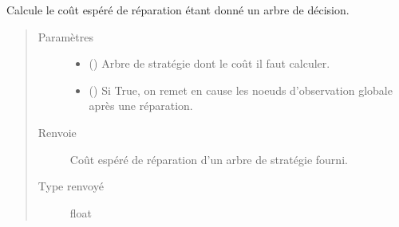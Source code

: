 \documentclass[letterpaper,10pt,french]{sphinxmanual}
\begin{document}
\begin{fulllineitems}
\begin{fulllineitems}
\label{\detokenize{index:DecisionTheoreticTroubleshooting.TroubleShootingProblem.expected_cost_of_repair}}
Calcule le coût espéré de réparation étant donné un arbre de décision.
\begin{quote}\begin{description}
\item[{Paramètres}] \leavevmode\begin{itemize}
\item {} 
 ({\hyperref[\detokenize{index:StrategyTree.StrategyTree}]{}}) \textendash{} Arbre de stratégie dont le coût il faut calculer.

\item {} 
 (\sphinxstyleliteralemphasis{\sphinxupquote{, }}) \textendash{} Si True, on remet en cause les noeuds d’observation globale après
une réparation.

\end{itemize}

\item[{Renvoie}] \leavevmode
{} \textendash{} Coût espéré de réparation d’un arbre de stratégie fourni.

\item[{Type renvoyé}] \leavevmode
float

\end{description}\end{quote}

\end{fulllineitems}



\end{fulllineitems}
\end{document}
